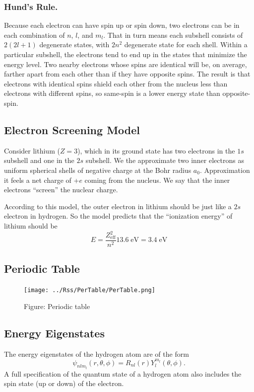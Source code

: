 \documentclass[../main.tex]{subfiles}
\begin{document}
\subsubsection*{Hund's Rule.} Because each electron can have spin up or spin down, two electrons can be in each
combination of $n$, $l$, and $m_l$. That in turn means each subshell consists of $2(2l + 1)$ degenerate states, with $2n^2$ degenerate state for each shell. Within a particular subshell, the electrons tend to end up in the states that minimize the energy level. Two nearby electrons whose spins are identical will be, on average, farther apart from each other than if they have opposite spins. The result is that electrons with identical spins shield each other from the nucleus less than electrons with different spins, so same-spin is a lower energy state than opposite-spin.


\subsection*{Electron Screening Model}
Consider lithium ($Z = 3$), which in its ground state has two electrons in the $1s$ subshell and one in the $2s$ subshell. We the approximate two inner electrons as uniform spherical shells of negative
charge at the Bohr radius $a_0$. Approximation it feels a net charge of +$e$ coming from the nucleus. We say that the inner electrons “screen” the nuclear charge. 

According to this model, the outer electron in lithium should be just like a $2s$ electron in hydrogen. So the model predicts that the “ionization energy” of lithium should be 
\begin{equation*}
    E=\frac{Z_{\text{eff}}^2}{n^2}13.6\;\text{eV}=3.4 \;\text{eV}
\end{equation*}

\subsection*{Periodic Table}
\clearpage
\begin{figure}[h]
        \centering
        \texttt{[image: ../Rss/PerTable/PerTable.png]}
        \caption*{Figure: Periodic table}
\end{figure}
\clearpage

\subsection*{Energy Eigenstates}
The energy eigenstates of the hydrogen atom are of the form
\begin{equation*}
    \psi_{nlm_l} (r,\theta,\phi) = R_{nl}(r)Y^{m_l}_l (\theta,\phi).
\end{equation*}
A full specification of the quantum state of a hydrogen atom also includes the spin state (up or down) of the electron.
\end{document}
